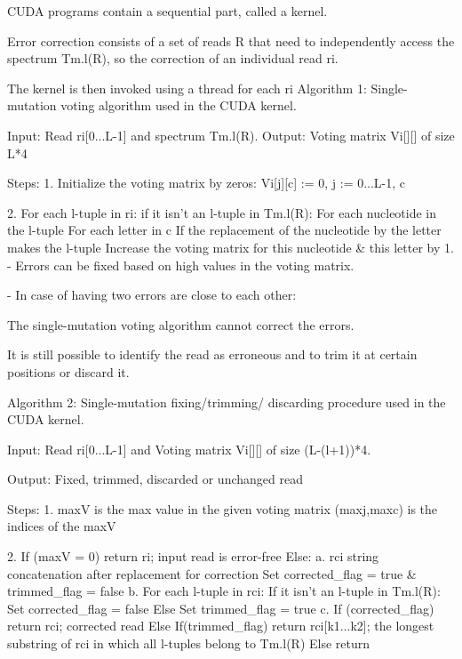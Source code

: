 \documentclass{llncs}
\begin{document}
CUDA programs contain a sequential part, called a kernel.

Error correction consists of a set of reads R that need to independently access the spectrum Tm.l(R), so the correction of an individual read ri.

The kernel is then invoked using a thread for each ri %
Algorithm 1: Single-mutation voting algorithm used in the CUDA kernel.

Input: Read ri[0...L-1] and spectrum Tm.l(R).
Output: Voting matrix Vi[][] of size L*4

Steps: 
  1. Initialize the voting matrix by zeros: Vi[j][c] := 0, j := 0...L-1, c %
  
  2. For each l-tuple in ri:
        if it isn't an l-tuple in Tm.l(R):
	   For each nucleotide in the l-tuple 
	     For each letter in c
		If the replacement of the nucleotide by the letter makes the l-tuple %
                     Increase the voting matrix for this nucleotide \& this letter by 1.
 - Errors can be fixed based on high values in the voting matrix. 


- In case of having two errors are close to each other:

     The single-mutation voting algorithm cannot correct the errors. 

      It is still possible to identify the read as erroneous and to trim it at certain 
      positions or discard it. 
      
  Algorithm 2: Single-mutation fixing/trimming/ discarding procedure used in the CUDA kernel.


Input: Read ri[0...L-1] and Voting matrix Vi[][] of size (L-(l+1))*4.

Output: Fixed, trimmed, discarded or unchanged read

Steps:
  1. maxV is the max value in the given voting matrix
     (maxj,maxc) is the indices of the maxV

2. If (maxV = 0) return ri;  input read is error-free
      Else: 
         a. rci  string concatenation after replacement for correction
            Set corrected\_flag = true \& trimmed\_flag = false
         b. For each l-tuple in rci:
               If it isn't an l-tuple in Tm.l(R):
                  Set corrected\_flag = false
               Else 
                  Set trimmed\_flag = true
         c. If (corrected\_flag) return rci; corrected read
             Else 
               If(trimmed\_flag) return rci[k1...k2]; the longest substring of rci in which all l-tuples belong to Tm.l(R)
               Else 
                   return %
         
\end{document}

